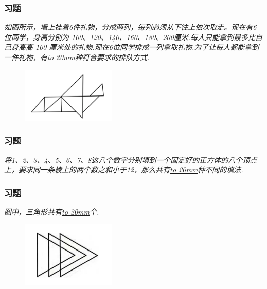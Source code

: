 \begin{frame}
    \frametitle{习题\theframecounter}
    \textit{如图所示，墙上挂着6件礼物，分成两列，每列必须从下往上依次取走。现在有6位同学，身高分别为 100、120、140、160、180、200厘米.每人只能拿到最多比自己身高高 100 厘米处的礼物.现在6位同学排成一列拿取礼物.为了让每人都能拿到一件礼物，有\underline{\hbox to 20mm{}}种符合要求的排队方式.}
    \begin{figure}[H] 
        \centering
        \includegraphics[width=0.4\textwidth]{./pics/Chapter_6/3.png}
    \end{figure}
\end{frame}


\begin{frame}
    \frametitle{习题\theframecounter}
    \vspace*{-3cm}
    \textit{将1、2、3、4、5、6、7、8这八个数字分别填到一个固定好的正方体的八个顶点上，要求同一条棱上的两个数之和小于12，那么共有\underline{\hbox to 20mm{}}种不同的填法.}
\end{frame}


\begin{frame}
    \frametitle{习题\theframecounter}
    \vspace*{-1cm}
    \textit{图中，三角形共有\underline{\hbox to 20mm{}}个.}
    \begin{figure}[H] 
        \centering
        \includegraphics[width=0.4\textwidth]{./pics/Chapter_6/5.png}
    \end{figure}
\end{frame}

